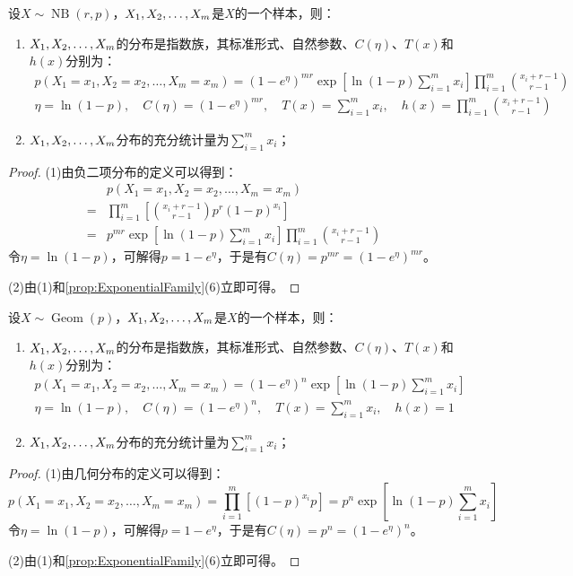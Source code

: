 \begin{theorem}
	设$X\sim\operatorname{NB}(r,p)$，$X_1, X_2, \dots, X_{m}$是$X$的一个样本，则：
	\begin{enumerate}
		\item $X_1, X_2, \dots, X_{m}$的分布是指数族，其标准形式、自然参数、$C(\eta)$、$T(x)$和$h(x)$分别为：
		\begin{gather*}
			p(X_1=x_1,X_2=x_2,\dots,X_m=x_m)=(1-e^{\eta})^{mr}\exp\left[\ln(1-p)\sum_{i=1}^{m}x_i\right]\prod_{i=1}^{m}\binom{x_i+r-1}{r-1} \\
			\eta=\ln(1-p),\quad C(\eta)=(1-e^{\eta})^{mr},\quad T(x)=\sum_{i=1}^{m}x_i,\quad h(x)=\prod_{i=1}^{m}\binom{x_i+r-1}{r-1}
		\end{gather*}
		\item $X_1, X_2, \dots, X_{m}$分布的充分统计量为$\sum\limits_{i=1}^{m}x_i$；
	\end{enumerate}
\end{theorem}
\begin{proof}
	(1)由负二项分布的定义可以得到：
	\begin{align*}
		&p(X_1=x_1,X_2=x_2,\dots,X_m=x_m) \\
		=&\prod_{i=1}^{m}\left[\binom{x_i+r-1}{r-1}p^r(1-p)^{x_i}\right] \\
		=&p^{mr}\exp\left[\ln(1-p)\sum_{i=1}^{m}x_i\right]\prod_{i=1}^{m}\binom{x_i+r-1}{r-1}
	\end{align*}
	令$\eta=\ln(1-p)$，可解得$p=1-e^{\eta}$，于是有$C(\eta)=p^{mr}=(1-e^{\eta})^{mr}$。\par
	(2)由(1)和\cref{prop:ExponentialFamily}(6)立即可得。
\end{proof}

\begin{theorem}
	设$X\sim\operatorname{Geom}(p)$，$X_1, X_2, \dots, X_{m}$是$X$的一个样本，则：
	\begin{enumerate}
		\item $X_1, X_2, \dots, X_{m}$的分布是指数族，其标准形式、自然参数、$C(\eta)$、$T(x)$和$h(x)$分别为：
		\begin{gather*}
			p(X_1=x_1,X_2=x_2,\dots,X_m=x_m)=(1-e^{\eta})^n\exp\left[\ln(1-p)\sum_{i=1}^{m}x_i\right] \\
			\eta=\ln(1-p),\quad C(\eta)=(1-e^{\eta})^n,\quad T(x)=\sum_{i=1}^{m}x_i,\quad h(x)=1
		\end{gather*}
		\item $X_1, X_2, \dots, X_{m}$分布的充分统计量为$\sum\limits_{i=1}^{m}x_i$；
	\end{enumerate}
\end{theorem}
\begin{proof}
	(1)由几何分布的定义可以得到：
	\begin{equation*}
		p(X_1=x_1,X_2=x_2,\dots,X_m=x_m)=\prod_{i=1}^{m}[(1-p)^{x_i}p]=p^n\exp\left[\ln(1-p)\sum_{i=1}^{m}x_i\right]
	\end{equation*}
	令$\eta=\ln(1-p)$，可解得$p=1-e^{\eta}$，于是有$C(\eta)=p^n=(1-e^{\eta})^n$。\par
	(2)由(1)和\cref{prop:ExponentialFamily}(6)立即可得。
\end{proof}

